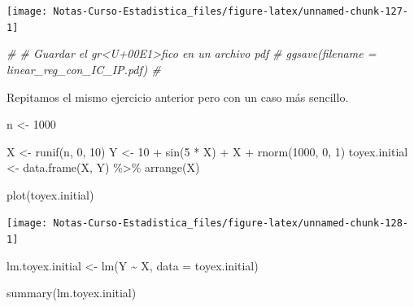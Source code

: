 \documentclass[
  12pt,
]{book}
\newenvironment{Shaded}{\begin{snugshade}}{\end{snugshade}}
\newcommand{\AttributeTok}[1]{\textcolor[rgb]{0.77,0.63,0.00}{#1}}
\newcommand{\CommentTok}[1]{\textcolor[rgb]{0.56,0.35,0.01}{\textit{#1}}}
\newcommand{\DecValTok}[1]{\textcolor[rgb]{0.00,0.00,0.81}{#1}}
\newcommand{\FunctionTok}[1]{\textcolor[rgb]{0.00,0.00,0.00}{#1}}
\newcommand{\NormalTok}[1]{#1}
\newcommand{\OtherTok}[1]{\textcolor[rgb]{0.56,0.35,0.01}{#1}}
\newcommand{\SpecialCharTok}[1]{\textcolor[rgb]{0.00,0.00,0.00}{#1}}
\theoremstyle{definition}
\theoremstyle{definition}
\theoremstyle{definition}
\theoremstyle{definition}
\theoremstyle{remark}
\begin{document}
\begin{center}\texttt{[image: Notas-Curso-Estadistica\_files/figure-latex/unnamed-chunk-127-1]} \end{center}

\begin{Shaded}
\begin{Highlighting}[]
\CommentTok{\# \# Guardar el gr\textless{}U+00E1\textgreater{}fico en un archivo pdf}
\CommentTok{\# ggsave(filename = \textquotesingle{}linear\_reg\_con\_IC\_IP.pdf\textquotesingle{}) \#}
\end{Highlighting}
\end{Shaded}

Repitamos el mismo ejercicio anterior pero con un caso más sencillo.

\begin{Shaded}
\begin{Highlighting}[]
\NormalTok{n }\OtherTok{\textless{}{-}} \DecValTok{1000}

\NormalTok{X }\OtherTok{\textless{}{-}} \FunctionTok{runif}\NormalTok{(n, }\DecValTok{0}\NormalTok{, }\DecValTok{10}\NormalTok{)}
\NormalTok{Y }\OtherTok{\textless{}{-}} \DecValTok{10} \SpecialCharTok{+} \FunctionTok{sin}\NormalTok{(}\DecValTok{5} \SpecialCharTok{*}\NormalTok{ X) }\SpecialCharTok{+}\NormalTok{ X }\SpecialCharTok{+} \FunctionTok{rnorm}\NormalTok{(}\DecValTok{1000}\NormalTok{, }\DecValTok{0}\NormalTok{, }\DecValTok{1}\NormalTok{)}
\NormalTok{toyex.initial }\OtherTok{\textless{}{-}} \FunctionTok{data.frame}\NormalTok{(X, Y) }\SpecialCharTok{\%\textgreater{}\%}
    \FunctionTok{arrange}\NormalTok{(X)}

\FunctionTok{plot}\NormalTok{(toyex.initial)}
\end{Highlighting}
\end{Shaded}

\begin{center}\texttt{[image: Notas-Curso-Estadistica\_files/figure-latex/unnamed-chunk-128-1]} \end{center}

\begin{Shaded}
\begin{Highlighting}[]
\NormalTok{lm.toyex.initial }\OtherTok{\textless{}{-}} \FunctionTok{lm}\NormalTok{(Y }\SpecialCharTok{\textasciitilde{}}\NormalTok{ X, }\AttributeTok{data =}\NormalTok{ toyex.initial)}

\FunctionTok{summary}\NormalTok{(lm.toyex.initial)}
\end{Highlighting}
\end{Shaded}
\end{document}
